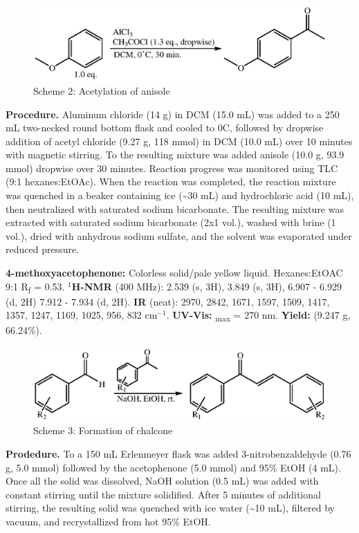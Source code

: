 \documentclass[11pt]{article}
\let\bf\textbf
\begin{document}
\begin{figure}[ht]
    \centering
    \includegraphics[scale=0.8]{schemes/acetylation.eps}
    \captionsetup{labelformat=empty}
    \caption{Scheme 2: Acetylation of anisole}
\end{figure}
\noindent\bf{Procedure.} Aluminum chloride (14 g) in DCM (15.0 mL) was added to a 250 mL two-necked round bottom flask and cooled to 0\degree C, followed by dropwise addition of acetyl chloride (9.27 g, 118 mmol) in DCM (10.0 mL) over 10 minutes with magnetic stirring. To the resulting mixture was added anisole (10.0 g, 93.9 mmol) dropwise over 30 minutes. Reaction progress was monitored using TLC (9:1 hexanes:EtOAc). When the reaction was completed, the reaction mixture was quenched in a beaker containing ice (\textasciitilde 30 mL) and hydrochloric acid (10 mL), then neutralized with saturated sodium bicarbonate. The resulting mixture was extracted with saturated sodium bicarbonate (2x1 vol.), washed with brine (1 vol.), dried with anhydrous sodium sulfate, and the solvent was evaporated under reduced pressure.

\noindent\bf{4-methoxyacetophenone:} Colorless solid/pale yellow liquid. Hexanes:EtOAC 9:1 R\textsubscript{f} = 0.53. \bf{$^1$H-NMR} (400 MHz): \textdelta\hspace{0mm} 2.539 (s, 3H), 3.849 (s, 3H), 6.907 - 6.929 (d, 2H) 7.912 - 7.934 (d, 2H). \bf{IR} (neat): 2970, 2842, 1671, 1597, 1509, 1417, 1357, 1247, 1169, 1025, 956, 832 cm$^{-1}$. \bf{UV-Vis:} \textlambda\textsubscript{max} = 270 nm. \bf{Yield:} (9.247 g, 66.24\%).

\begin{figure}[H]
    \centering
    \includegraphics[scale=0.8]{schemes/chalcone.eps}
    \captionsetup{labelformat=empty}
    \caption{Scheme 3: Formation of chalcone}
\end{figure}
\noindent\bf{Prodedure.} To a 150 mL Erlenmeyer flask was added 3-nitrobenzaldehyde (0.76 g, 5.0 mmol) followed by the acetophenone (5.0 mmol) and 95\% EtOH (4 mL). Once all the solid was dissolved, NaOH solution (0.5 mL) was added with constant stirring until the mixture solidified. After 5 minutes of additional stirring, the resulting solid was quenched with ice water (\textasciitilde 10 mL), filtered by vacuum, and recrystallized from hot 95\% EtOH.
\end{document}
